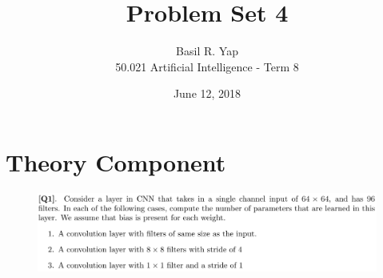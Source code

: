 \documentclass[12pt]{article}
\begin{document}
 
 
\title{Problem Set 4}%
\author{Basil R. Yap\\ %
50.021 Artificial Intelligence - Term 8} %
\date{June 12, 2018}
\maketitle

\section{Theory Component}
\begin{figure}[h!]
\includegraphics[width=\linewidth]{./assets/201806161634.png}
\end{figure}
\end{document}
